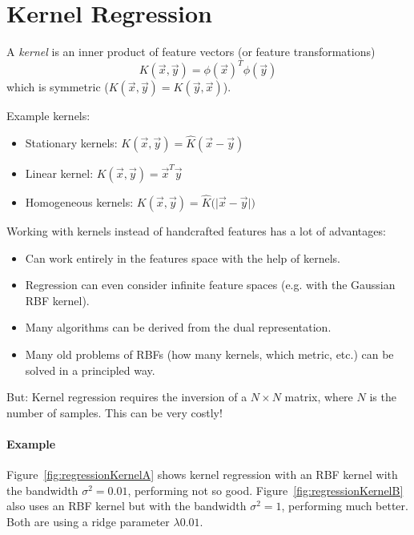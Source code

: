 	\section{Kernel Regression}
		A \emph{kernel} is an inner product of feature vectors (or feature transformations)
		\begin{equation}
			K(\vec{x}, \vec{y}) = \phi(\vec{x})^T \phi(\vec{y})
		\end{equation}
		which is symmetric (\( K(\vec{x}, \vec{y}) = K(\vec{y}, \vec{x}) \)).
		
		Example kernels:
		\begin{itemize}
			\item Stationary kernels:  \tabto{3cm} \( K(\vec{x}, \vec{y}) = \hat{K}(\vec{x} - \vec{y}) \)
			\item Linear kernel:       \tabto{3cm} \( K(\vec{x}, \vec{y}) = \vec{x}^T \vec{y} \)
			\item Homogeneous kernels: \tabto{3cm} \( K(\vec{x}, \vec{y}) = \hat{K}\big( \lvert \vec{x} - \vec{y} \rvert \big) \)
		\end{itemize}
	
		Working with kernels instead of handcrafted features has a lot of advantages:
		\begin{itemize}
			\item Can work entirely in the features space with the help of kernels.
			\item Regression can even consider infinite feature spaces (e.g. with the Gaussian RBF kernel).
			\item Many algorithms can be derived from the dual representation.
			\item Many old problems of RBFs (how many kernels, which metric, etc.) can be solved in a principled way.
		\end{itemize}
		But: Kernel regression requires the inversion of a \( N \times N \) matrix, where \(N\) is the number of samples. This can be very costly!
		
		\paragraph{Example}
			Figure~\ref{fig:regressionKernelA} shows kernel regression with an RBF kernel with the bandwidth \( \sigma^2 = 0.01 \), performing not so good. Figure~\ref{fig:regressionKernelB} also uses an RBF kernel but with the bandwidth \( \sigma^2 = 1 \), performing much better. Both are using a ridge parameter \( \lambda 0.01 \).
			
